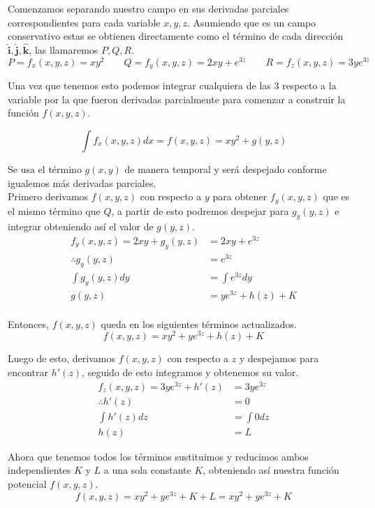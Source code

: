\documentclass{article}
\begin{document}
Comenzamos separando nuestro campo en sus derivadas parciales correspondientes para cada variable $x,y,z$. 
Asumiendo que es un campo conservativo estas se obtienen directamente como el término de cada dirección 
$\pmb{\hat{i}},\pmb{\hat{j}},\pmb{\hat{k}}$, las llamaremos $P,Q,R$.
\begin{equation*}
    P=f_{x}(x,y,z)=xy^2 \qquad Q=f_{y}(x,y,z)=2xy+e^{3z} \qquad R=f_{z}(x,y,z)=3ye^{3z}
\end{equation*}

Una vez que tenemos esto podemos integrar cualquiera de las 3 respecto a la variable por la que fueron 
derivadas parcialmente para comenzar a construir la función $f(x,y,z)$.

\begin{equation*}
    \int f_{x}(x,y,z)dx=f(x,y,z)=xy^2+g(y,z)
\end{equation*}

Se usa el término $g(x,y)$ de manera temporal y será despejado conforme igualemos más derivadas parciales.\\

Primero derivamos $f(x,y,z)$ con respecto a $y$ para obtener $f_{y}(x,y,z)$ que es el mismo término que $Q$, a partir de esto
podremos despejar para $g_{y}(y,z)$ e integrar obteniendo así el valor de $g(y,z)$.
\begin{equation*}
    \begin{split}
        f_{y}(x,y,z)=2xy+g_{y}(y,z)&=2xy+e^{3z} \\
        \therefore g_{y}(y,z)&=e^{3z} \\
        \int g_{y}(y,z)dy&=\int e^{3z}dy\\
        g(y,z)&=ye^{3z}+h(z)+K\\
    \end{split}
\end{equation*}

Entonces, $f(x,y,z)$ queda en los siguientes términos actualizados.
\begin{equation*}
    f(x,y,z)=xy^2+ye^{3z}+h(z)+K
\end{equation*}

Luego de esto, derivamos $f(x,y,z)$ con respecto a $z$ y despejamos para encontrar $h'(z)$, seguido de esto integramos y obtenemos su valor.
\begin{equation*}
    \begin{split}
        f_{z}(x,y,z)=3ye^{3z}+h'(z)&=3ye^{3z}\\
        \therefore h'(z)&=0\\
        \int h'(z)dz&=\int 0dz\\
        h(z)&=L
    \end{split}
\end{equation*}

Ahora que tenemos todos los términos sustituimos y reducimos ambos independientes $K$ y $L$ a una sola constante $K$, obteniendo así nuestra función potencial $f(x,y,z)$.
\begin{equation*}
    f(x,y,z)=xy^2+ye^{3z}+K+L=xy^2+ye^{3z}+K
\end{equation*}
\end{document}
